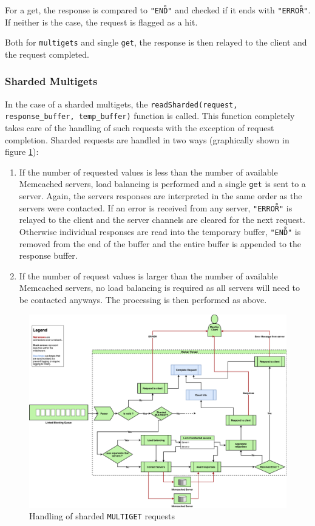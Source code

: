 \documentclass[11pt,a4paper]{article}
\begin{document}
For a get, the response is compared to \texttt{"END\r\n"} and checked if it ends with \texttt{"ERROR\r\n"}. If neither is the case, the request is flagged as a hit.

Both for \texttt{multigets} and single \texttt{get}, the response is then relayed to the client and the request completed.


\subsubsection{Sharded Multigets}
In the case of a sharded multigets, the \texttt{readSharded(request, response_buffer, temp_buffer)} function is called. This function completely takes care of the handling of such requests with the exception of request completion. Sharded requests are handled in two ways (graphically shown in figure \ref{png::multigets_handling}):
\begin{enumerate}
    \item If the number of requested values is less than the number of available Memcached servers, load balancing is performed and a single \texttt{get} is sent to a server. Again, the servers responses are interpreted in the same order as the servers were contacted. If an error is received from any server, \texttt{"ERROR\r\n"} is relayed to the client and the server channels are cleared for the next request. Otherwise individual responses are read into the temporary buffer, \texttt{"END\r\n"} is removed from the end of the buffer and the entire buffer is appended to the response buffer.
    \item If the number of request values is larger than the number of available Memcached servers, no load balancing is required as all servers will need to be contacted anyways. The processing is then performed as above.
\end{enumerate}
\begin{figure}[h]
    \centering
    \includegraphics[width=\textwidth]{processing/graphics/multigets_handling.png}
    \caption{Handling of sharded \texttt{MULTIGET} requests}
    \label{png::multigets_handling}
\end{figure}
\end{document}
